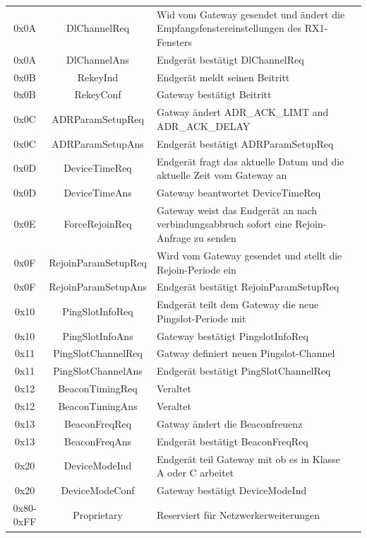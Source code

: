 \documentclass[a4paper, 12pt]{article}
\begin{document}
\begin{longtable}{c |c | p{9cm} c}
                    0x0A & DlChannelReq & Wid vom Gateway gesendet und ändert die Empfangsfenstereinstellungen des RX1-Fensters \\
                    0x0A & DlChannelAns & Endgerät bestätigt DlChannelReq \\
                    0x0B & RekeyInd & Endgerät meldt seinen Beitritt \\
                    0x0B & RekeyConf & Gateway bestätigt Beitritt \\
                    0x0C & ADRParamSetupReq & Gatway ändert ADR\_ACK\_LIMT and ADR\_ACK\_DELAY \\
                    0x0C & ADRParamSetupAns & Endgerät bestätigt ADRParamSetupReq \\
                    0x0D & DeviceTimeReq & Endgerät fragt das aktuelle Datum und die aktuelle Zeit vom Gateway an \\
                    0x0D & DeviceTimeAns & Gateway beantwortet DeviceTimeReq \\
                    0x0E & ForceRejoinReq & Gateway weist das Endgerät an nach verbindungsabbruch sofort eine Rejoin-Anfrage zu senden \\
                    0x0F & RejoinParamSetupReq & Wird vom Gateway gesendet und stellt die Rejoin-Periode ein \\
                    0x0F & RejoinParamSetupAns & Endgerät bestätigt RejoinParamSetupReq \\
                    0x10 & PingSlotInfoReq & Endgerät teilt dem Gateway die neue Pingslot-Periode mit \\
                    0x10 & PingSlotInfoAns & Gateway bestätigt PingslotInfoReq \\
                    0x11 & PingSlotChannelReq & Gatway definiert neuen Pingslot-Channel \\
                    0x11 & PingSlotChannelAns & Endgerät bestätigt PingSlotChannelReq \\
                    0x12 & BeaconTimingReq & Veraltet \\
                    0x12 & BeaconTimingAns & Veraltet \\
                    0x13 & BeaconFreqReq & Gatway ändert die Beaconfreuenz \\
                    0x13 & BeaconFreqAns & Endgerät bestätigt BeaconFreqReq\\
                    0x20 & DeviceModeInd & Endgerät teil Gateway mit ob es in Klasse A oder C arbeitet \\
                    0x20 & DeviceModeConf & Gateway bestätigt DeviceModeInd \\
                    0x80-0xFF & Proprietary & Reserviert für Netzwerkerweiterungen \\
                    
                    
                \end{longtable}
                
\end{document}
